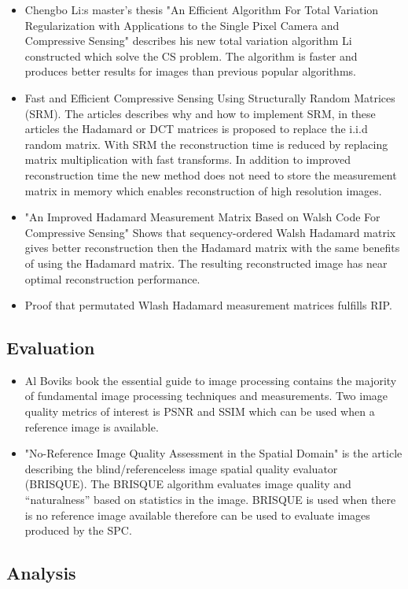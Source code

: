 \begin{itemize}
    
    \item \cite{article:TVAL3} Chengbo Li:s master's thesis "An Efficient Algorithm For Total Variation Regularization with Applications to the Single Pixel Camera and Compressive Sensing" describes his new total variation algorithm Li constructed which solve the CS problem. The algorithm is faster and produces better results for images than previous popular algorithms.   

    \item \cite{article:SRM_short, article:SRM_long, article:SRM_block} Fast and Efficient Compressive Sensing Using Structurally Random Matrices (SRM). The articles describes why and how to implement SRM, in these articles the Hadamard or DCT matrices is proposed to replace the i.i.d random matrix. With SRM the reconstruction time is reduced by replacing matrix multiplication with fast transforms. In addition to improved reconstruction time the new method does not need to store the measurement matrix in memory which enables reconstruction of high resolution images. 

\item \cite{article:an_improved_WH_matrix} "An Improved Hadamard Measurement Matrix Based on Walsh Code For Compressive Sensing" Shows that sequency-ordered Walsh Hadamard matrix gives better reconstruction then the Hadamard matrix with the same benefits of using the Hadamard matrix. The resulting reconstructed image has near optimal reconstruction performance.
	
\item \cite{article:WH_mixed_RIP_prof} Proof that permutated Wlash Hadamard measurement matrices fulfills RIP.

\end{itemize}


\subsection{Evaluation}

\begin{itemize}

    \item Al Boviks book the essential guide to image processing \cite{book:image_processing} contains the majority of fundamental image processing techniques and measurements. Two image quality metrics of interest is PSNR and SSIM which can be used when a reference image is available.
    
\item \cite{article:brisque} "No-Reference Image Quality Assessment
in the Spatial Domain" is the article describing the blind/referenceless image spatial quality evaluator (BRISQUE). The BRISQUE algorithm evaluates image quality and “naturalness” based on statistics in the image. BRISQUE is used when there is no reference image available therefore can be used to evaluate images produced by the SPC.  
    
    
\end{itemize}



\subsection{Analysis}